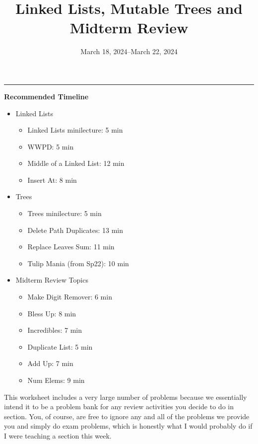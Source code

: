 \documentclass{exam}
\title{Linked Lists, Mutable Trees and Midterm Review}
\date{March 18, 2024--March 22, 2024}
\begin{document}
\maketitle
\rule{\textwidth}{0.15em}

\begin{meta}
    \textbf{Recommended Timeline}
    \begin{itemize}
        \item Linked Lists
        \begin{itemize}
            \item Linked Lists minilecture: 5 min
            \item WWPD: 5 min
            \item Middle of a Linked List: 12 min
            \item Insert At: 8 min
        \end{itemize}
        \item Trees
        \begin{itemize}
            \item Trees minilecture: 5 min
            \item Delete Path Duplicates: 13 min
            \item Replace Leaves Sum: 11 min
            \item Tulip Mania (from Sp22): 10 min
        \end{itemize}
        \item Midterm Review Topics
        \begin{itemize}
            \item Make Digit Remover: 6 min
            \item Bless Up: 8 min
            \item Incredibles: 7 min
            \item Duplicate List: 5 min
            \item Add Up: 7 min
            \item Num Elems: 9 min
        \end{itemize}
    \end{itemize}
    This worksheet includes a very large number of problems because we essentially intend it to be a problem bank for any review activities you decide to do in section. You, of course, are free to ignore any and all of the problems we provide you and simply do exam problems, which is honestly what I would probably do if I were teaching a section this week. 


\end{meta}
\end{document}
